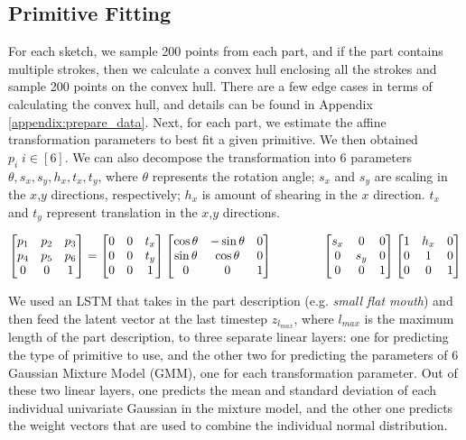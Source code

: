 \subsection{Primitive Fitting}
For each sketch, we sample 200 points from each part, and if the part contains multiple strokes, then we calculate a convex hull enclosing all the strokes and sample 200 points on the convex hull. There are a few edge cases in terms of calculating the convex hull, and details can be found in Appendix \ref{appendix:prepare_data}. Next, for each part, we estimate the affine transformation parameters to best fit a given primitive. We then obtained $p_i \; i \in [6]$. We can also decompose the transformation into 6 parameters $\theta, s_x,s_y,h_x,t_x,t_y$, where $\theta$ represents the rotation angle; $s_x$ and $s_y$ are scaling in the $x$,$y$ directions, respectively; $h_x$ is amount of shearing in the $x$ direction. $t_x$ and $t_y$ represent translation in the $x$,$y$ directions. 

$
\begin{bmatrix}
p_1 & p_2 & p_3\\
p_4 & p_5 & p_6 \\
0 & 0 & 1 \\
\end{bmatrix}
= 
\begin{bmatrix}
0 & 0 & t_x\\
0 & 0 & t_y\\
0 & 0 & 1 \\
\end{bmatrix}
\begin{bmatrix}
\cos \theta & -\sin \theta & 0\\
\sin \theta & \cos \theta & 0\\
0 & 0 & 1 \\
\end{bmatrix}
\\
\hspace{4em}
\begin{bmatrix}
s_x & 0 & 0\\
0 & s_y & 0\\
0 & 0 & 1 \\
\end{bmatrix}
\begin{bmatrix}
1 & h_x & 0\\
0 & 1 & 0\\
0 & 0 & 1 \\
\end{bmatrix}
$

We used an LSTM that takes in the part description (e.g. \textit{small flat mouth}) and then feed the latent vector at the last timestep $z_{l_{max}}$, where $l_{max}$ is the maximum length of the part description, to three separate linear layers: one for predicting the type of primitive to use, and the other two for predicting the parameters of 6 Gaussian Mixture Model (GMM), one for each transformation parameter. Out of these two linear layers, one predicts the mean and standard deviation of each individual univariate Gaussian in the mixture model, and the other one predicts the weight vectors that are used to combine the individual normal distribution.



